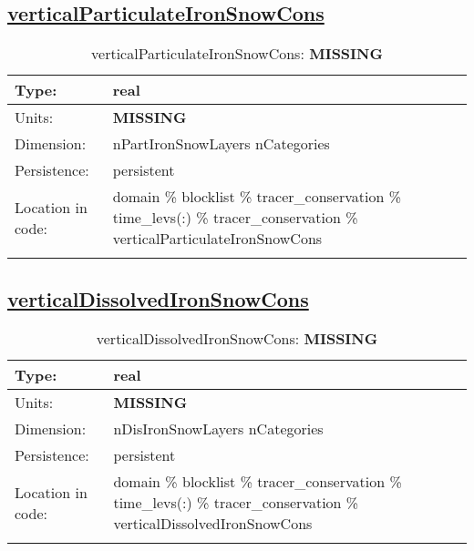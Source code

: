 \subsection[verticalParticulateIronSnowCons]{\hyperref[sec:var_tab_tracer_conservation]{verticalParticulateIronSnowCons}}
\label{subsec:var_sec_tracer_conservation_verticalParticulateIronSnowCons}
\begin{center}
\begin{longtable}{| p{2.0in} | p{4.0in} |}
        \hline 
        Type: & real \\
        \hline 
        Units: & {\bf \color{red} MISSING} \\
        \hline 
        Dimension: & nPartIronSnowLayers nCategories \\
        \hline 
        Persistence: & persistent \\
        \hline 
         Location in code: & domain \% blocklist \% tracer\_conservation \% time\_levs(:) \% tracer\_conservation \% verticalParticulateIronSnowCons \\
         \hline 
    \caption{verticalParticulateIronSnowCons: {\bf \color{red} MISSING}}
\end{longtable}
\end{center}
\subsection[verticalDissolvedIronSnowCons]{\hyperref[sec:var_tab_tracer_conservation]{verticalDissolvedIronSnowCons}}
\label{subsec:var_sec_tracer_conservation_verticalDissolvedIronSnowCons}
\begin{center}
\begin{longtable}{| p{2.0in} | p{4.0in} |}
        \hline 
        Type: & real \\
        \hline 
        Units: & {\bf \color{red} MISSING} \\
        \hline 
        Dimension: & nDisIronSnowLayers nCategories \\
        \hline 
        Persistence: & persistent \\
        \hline 
         Location in code: & domain \% blocklist \% tracer\_conservation \% time\_levs(:) \% tracer\_conservation \% verticalDissolvedIronSnowCons \\
         \hline 
    \caption{verticalDissolvedIronSnowCons: {\bf \color{red} MISSING}}
\end{longtable}
\end{center}
